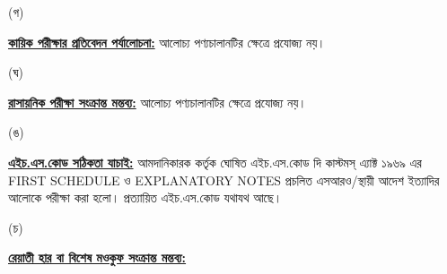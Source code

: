 \documentclass[12pt]{article}
\begin{document}
\begin{minipage}[t]{0.05\linewidth}
\hspace{1em}
\end{minipage}
\begin{minipage}[t]{0.05\linewidth}
(গ)
\end{minipage}
\begin{minipage}[t]{0.90\linewidth}
\underline{\textbf{কায়িক পরীক্ষার প্রতিবেদন পর্যালোচনা:}}
আলোচ্য পণ্যচালানটির ক্ষেত্রে প্রযোজ্য নয়।
\\
\end{minipage}
\begin{minipage}[t]{0.05\linewidth}
\hspace{1em}
\end{minipage}
\begin{minipage}[t]{0.05\linewidth}
(ঘ)
\end{minipage}
\begin{minipage}[t]{0.90\linewidth}
\underline{\textbf{রাসায়নিক পরীক্ষা সংক্রান্ত মন্তব্য:}}
আলোচ্য পণ্যচালানটির ক্ষেত্রে প্রযোজ্য নয়।
\\
\end{minipage}
\begin{minipage}[t]{0.05\linewidth}
\hspace{1em}
\end{minipage}
\begin{minipage}[t]{0.05\linewidth}
(ঙ)
\end{minipage}
\begin{minipage}[t]{0.90\linewidth}
\underline{\textbf{এইচ.এস.কোড সঠিকতা যাচাই:}}
আমদানিকারক কর্তৃক ঘোষিত এইচ.এস.কোড দি কাস্টমস্ এ্যাক্ট ১৯৬৯ এর FIRST SCHEDULE ও
EXPLANATORY NOTES প্রচলিত এসআরও/স্থায়ী আদেশ ইত্যাদির আলোকে পরীক্ষা করা হলো।
প্রত্যায়িত এইচ.এস.কোড যথাযথ আছে।
\\
\end{minipage}
\newpage
\noindent
\begin{minipage}[t]{0.05\linewidth}
\hspace{1em}
\end{minipage}
\begin{minipage}[t]{0.05\linewidth}
(চ)
\end{minipage}
\begin{minipage}[t]{0.90\linewidth}
\underline{\textbf{রেয়াতী হার বা বিশেষ মওকুফ সংক্রান্ত মন্তব্য:}}
\end{minipage}
\begin{minipage}[t]{0.1\linewidth}
\hspace{1em}
\end{minipage}
\end{document}

